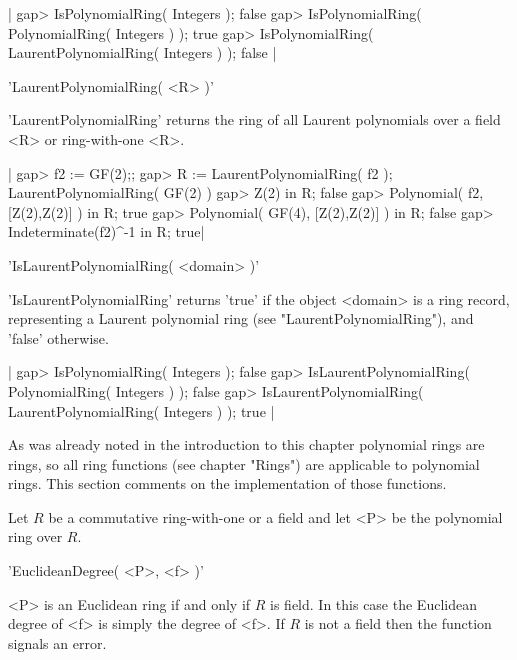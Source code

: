 |    gap> IsPolynomialRing( Integers );                  
    false
    gap> IsPolynomialRing( PolynomialRing( Integers ) );
    true
    gap> IsPolynomialRing( LaurentPolynomialRing( Integers ) );
    false |



'LaurentPolynomialRing( <R> )'

'LaurentPolynomialRing'  returns the ring of all Laurent polynomials over
a field <R> or ring-with-one <R>.

|    gap> f2 := GF(2);;
    gap> R := LaurentPolynomialRing( f2 );
    LaurentPolynomialRing( GF(2) )
    gap> Z(2) in R;
    false
    gap> Polynomial( f2, [Z(2),Z(2)] ) in R;   
    true
    gap> Polynomial( GF(4), [Z(2),Z(2)] ) in R;
    false
    gap> Indeterminate(f2)^-1 in R;
    true|



'IsLaurentPolynomialRing( <domain> )'

'IsLaurentPolynomialRing' returns 'true' if the object <domain> is a ring
record,    representing     a    Laurent     polynomial     ring     (see
"LaurentPolynomialRing"), and 'false' otherwise.
    
|    gap> IsPolynomialRing( Integers );                  
    false
    gap> IsLaurentPolynomialRing( PolynomialRing( Integers ) );
    false
    gap> IsLaurentPolynomialRing( LaurentPolynomialRing( Integers ) );
    true |



As was already noted in the introduction to this chapter polynomial rings
are rings, so all ring functions (see chapter "Rings") are  applicable to
polynomial rings.  This section comments on the implementation  of  those
functions.

Let $R$ be  a  commutative ring-with-one or  a field and  let <P>  be the
polynomial ring over $R$.

\vspace{5mm}
'EuclideanDegree( <P>, <f> )'%

<P> is an Euclidean ring if  and only if $R$  is field. In this case  the
Euclidean  degree  of <f> is simply the degree  of  <f>.  If $R$ is not a
field then the function signals an error.

